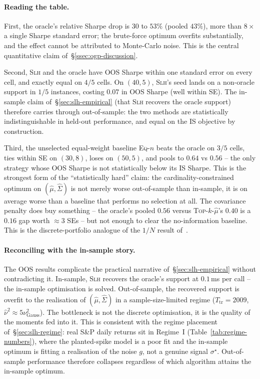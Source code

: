 \paragraph{Reading the table.}
First, the oracle's relative Sharpe drop is $30$ to $53\%$ (pooled $43\%$), more than
$8\times$ a single Sharpe standard error; the brute-force optimum overfits
substantially, and the effect cannot be attributed to Monte-Carlo noise. This is the
central quantitative claim of~\S\ref{ssec:ogp-discussion}.

Second, \textsc{Slh} and the oracle have OOS Sharpe within one standard error on every
cell, and exactly equal on $4/5$ cells. On $(40,5)$, \textsc{Slh}'s seed lands on a
non-oracle support in $1/5$ instances, costing $0.07$ in OOS Sharpe (well within SE).
The in-sample claim of~\S\ref{sec:slh-empirical} (that \textsc{Slh} recovers the
oracle support) therefore carries through out-of-sample: the two methods are
statistically indistinguishable in held-out performance, and equal on the IS
objective by construction.

Third, the unselected equal-weight baseline \textsc{Eq-$n$} beats the oracle on $3/5$
cells, ties within SE on $(30,8)$, loses on $(50,5)$, and pools to $0.64$ vs $0.56$ --
the only strategy whose OOS Sharpe is not statistically below its IS Sharpe. This is
the strongest form of the ``statistically hard'' claim: the cardinality-constrained
optimum on $(\hat\mu, \hat\Sigma)$ is not merely worse out-of-sample than in-sample,
it is on average worse than a baseline that performs no selection at all. The
covariance penalty does buy something -- the oracle's pooled $0.56$ versus
\textsc{Top-$k$-$\hat\mu$}'s $0.40$ is a $0.16$ gap worth $\approx 3$ SEs -- but not
enough to clear the no-information baseline. This is the discrete-portfolio analogue
of the $1/N$ result of~\cite{demiguel-garlappi-uppal}.
 
\paragraph{Reconciling with the in-sample story.}
The OOS results complicate the practical narrative of~\S\ref{sec:slh-empirical}
without contradicting it. In-sample, \textsc{Slh} recovers the oracle's support at
$0.1$\,ms per call -- the in-sample optimisation is solved. Out-of-sample, the
recovered support is overfit to the realisation of $(\hat\mu, \hat\Sigma)$ in a
sample-size-limited regime ($T_{\mathrm{tr}}=2009$,
$\hat\nu^2 \approx 5\nu^2_{\mathrm{Gauss}}$). The bottleneck is not the discrete
optimisation, it is the quality of the moments fed into it. This is consistent with
the regime placement of~\S\ref{sec:slh-regime}: real S\&P daily returns sit in
Regime~I (Table~\ref{tab:regime-numbers}), where the planted-spike model is a poor
fit and the in-sample optimum is fitting a realisation of the noise $g$, not a
genuine signal $\sigma^\star$. Out-of-sample performance therefore collapses regardless
of which algorithm attains the in-sample optimum.
 
